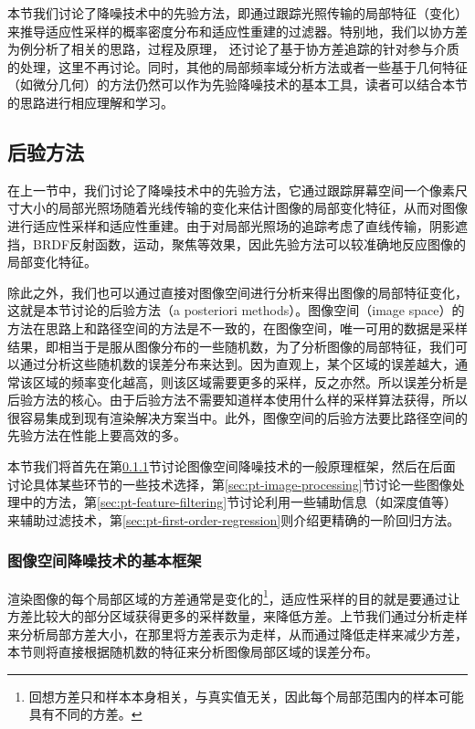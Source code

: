 本节我们讨论了降噪技术中的先验方法，即通过跟踪光照传输的局部特征（变化）来推导适应性采样的概率密度分布和适应性重建的过滤器。特别地，我们以协方差为例分析了相关的思路，过程及原理，
\cite{a:ALocalFrequencyAnalysisofLightScatteringandAbsorption}还讨论了基于协方差追踪的针对参与介质的处理，这里不再讨论。同时，其他的局部频率域分析方法或者一些基于几何特征（如微分几何）的方法仍然可以作为先验降噪技术的基本工具，读者可以结合本节的思路进行相应理解和学习。







\subsection{后验方法}
在上一节中，我们讨论了降噪技术中的先验方法，它通过跟踪屏幕空间一个像素尺寸大小的局部光照场随着光线传输的变化来估计图像的局部变化特征，从而对图像进行适应性采样和适应性重建。由于对局部光照场的追踪考虑了直线传输，阴影遮挡，BRDF反射函数，运动，聚焦等效果，因此先验方法可以较准确地反应图像的局部变化特征。

除此之外，我们也可以通过直接对图像空间进行分析来得出图像的局部特征变化，这就是本节讨论的后验方法（a posteriori methods）。图像空间（image space）的方法在思路上和路径空间的方法是不一致的，在图像空间，唯一可用的数据是采样结果，即相当于是服从图像分布的一些随机数，为了分析图像的局部特征，我们可以通过分析这些随机数的误差分布来达到。因为直观上，某个区域的误差越大，通常该区域的频率变化越高，则该区域需要更多的采样，反之亦然。所以误差分析是后验方法的核心。由于后验方法不需要知道样本使用什么样的采样算法获得，所以很容易集成到现有渲染解决方案当中。此外，图像空间的后验方法要比路径空间的先验方法在性能上要高效的多。

本节我们将首先在第\ref{sec:pt-adaptive-framework}节讨论图像空间降噪技术的一般原理框架，然后在后面讨论具体某些环节的一些技术选择，第\ref{sec:pt-image-processing}节讨论一些图像处理中的方法，第\ref{sec:pt-feature-filtering}节讨论利用一些辅助信息（如深度值等）来辅助过滤技术，第\ref{sec:pt-first-order-regression}则介绍更精确的一阶回归方法。







\subsubsection{图像空间降噪技术的基本框架}\label{sec:pt-adaptive-framework}
渲染图像的每个局部区域的方差通常是变化的\footnote{回想方差只和样本本身相关，与真实值无关，因此每个局部范围内的样本可能具有不同的方差。}，适应性采样的目的就是要通过让方差比较大的部分区域获得更多的采样数量，来降低方差。上节我们通过分析走样来分析局部方差大小，在那里将方差表示为走样，从而通过降低走样来减少方差，本节则将直接根据随机数的特征来分析图像局部区域的误差分布。

